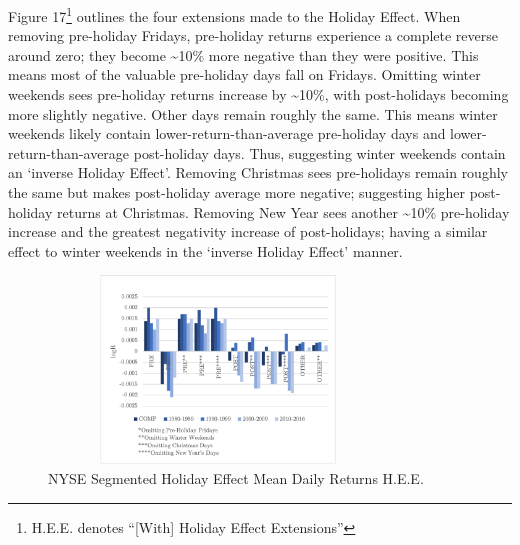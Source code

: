 \documentclass[11pt, english]{article}
\begin{document}
	Figure 17\footnote{H.E.E. denotes ``[With] Holiday Effect Extensions''} outlines the four extensions made to the Holiday Effect. When removing pre-holiday Fridays, pre-holiday returns experience a complete reverse around zero; they become \~{}10\% more negative than they were positive. This means most of the valuable pre-holiday days fall on Fridays. Omitting winter weekends sees pre-holiday returns increase by \~{}10\%, with post-holidays becoming more slightly negative. Other days remain roughly the same. This means winter weekends likely contain lower-return-than-average pre-holiday days and lower-return-than-average post-holiday days. Thus, suggesting winter weekends contain an `inverse Holiday Effect'. Removing Christmas sees pre-holidays remain roughly the same but makes post-holiday average more negative; suggesting higher post-holiday returns at Christmas. Removing New Year sees another \~{}10\% pre-holiday increase and the greatest negativity increase of post-holidays; having a similar effect to winter weekends in the `inverse Holiday Effect' manner.

	\begin{figure}[H]
        \begin{center}
                \includegraphics[width=9cm,height=5cm]{NYSE-HE3.png}              
                \caption{NYSE Segmented Holiday Effect Mean Daily Returns H.E.E.}    
        \end{center}
        \end{figure}
\end{document}
